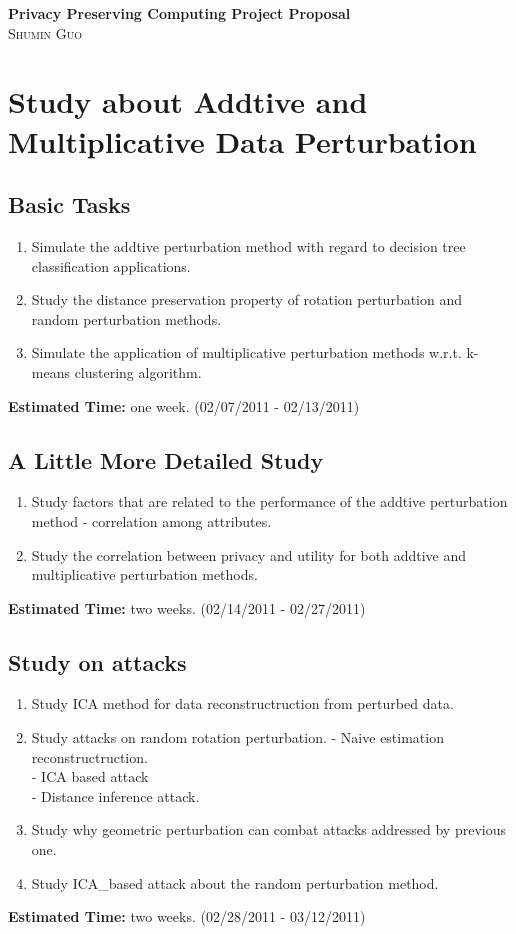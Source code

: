 \documentclass[12pt]{article}
\begin{document}
\begin{center}                  %
\textbf{\LARGE{Privacy Preserving Computing Project Proposal}} \\ 
\small\textsc{Shumin Guo} \\
\end{center}

\section*{Study about Addtive and Multiplicative Data Perturbation}
\subsection*{Basic Tasks}
\begin{enumerate}
\item Simulate the addtive perturbation method with regard to decision
  tree classification applications. 
\item Study the distance preservation property of rotation
  perturbation and random perturbation methods.
\item Simulate the application of multiplicative perturbation methods
  w.r.t. k-means clustering algorithm. 
\end{enumerate}

\textbf{Estimated Time: } one week. (02/07/2011 - 02/13/2011)

\subsection*{A Little More Detailed Study}
\begin{enumerate}
\item Study factors that are related to the performance of the addtive
  perturbation method - correlation among attributes. 
\item Study the correlation between privacy and utility for both
  addtive and multiplicative perturbation methods. 
\end{enumerate}

\textbf{Estimated Time: } two weeks. (02/14/2011 - 02/27/2011)

\subsection*{Study on attacks}
\begin{enumerate}
\item Study ICA method for data reconstructruction from perturbed
  data. 
\item Study attacks on random rotation perturbation. 
  - Naive estimation reconstructruction. \\
  - ICA based attack  \\ 
  - Distance inference attack.
\item Study why geometric perturbation can combat attacks addressed by
  previous one. 
\item Study ICA\_based attack about the random perturbation method. 
\end{enumerate}

\textbf{Estimated Time: } two weeks. (02/28/2011 - 03/12/2011)
\end{document}

